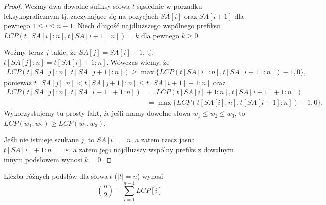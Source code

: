 \begin{proof}{}{}
  Weźmy dwa dowolne sufiksy słowa $t$ sąsiednie w porządku leksykograficznym tj. zaczynające się na pozycjach $SA[i]$ oraz $SA[i + 1]$ dla pewnego $1 \le i \le n - 1$. Niech długość najdłuższego wspólnego prefiksu $LCP(t[SA[i]:n], t[SA[i + 1]:n]) = k$ dla pewnego $k \ge 0$.

  Weźmy teraz $j$ takie, że $SA[j] = SA[i] + 1$, tj. $t[SA[j]:n] = t[SA[i] + 1:n]$. Wówczas wiemy, że
  \begin{align*}
    LCP(t[SA[j]:n], t[SA[j + 1]:n]) \ge \max\{LCP(t[SA[i]:n], t[SA[i + 1]:n]) - 1, 0\},
  \end{align*}
  ponieważ $t[SA[j]:n] < t[SA[j + 1]:n] \le t[SA[i + 1] + 1:n]$
  oraz
  \begin{align*}
    LCP(t[SA[j]:n], t[SA[i + 1] + 1:n])
        & = LCP(t[SA[i] + 1:n], t[SA[i + 1] + 1:n]) \\
        & = \max\{LCP(t[SA[i]:n], t[SA[i + 1]:n]) - 1, 0\}.
  \end{align*}
  Wykorzystujemy tu prosty fakt, że jeśli mamy dowolne słowa $w_1 \le w_2 \le w_3$, to $LCP(w_1, w_2) \ge LCP(w_1, w_3)$.

  Jeśli nie istnieje szukane $j$, to $SA[i] = n$, a zatem rzecz jasna $t[SA[i] + 1:n] = \varepsilon$, a zatem jego najdłuższy wspólny prefiks z dowolnym innym podsłowem wynosi $k = 0$.
\end{proof}

\begin{theorem}{}{}
  Liczba różnych podsłów dla słowa $t$ ($|t| = n$) wynosi
  \begin{equation*}
    \binom{n}{2} - \sum_{i = 1}^{n - 1} LCP[i]
  \end{equation*}
\end{theorem}

